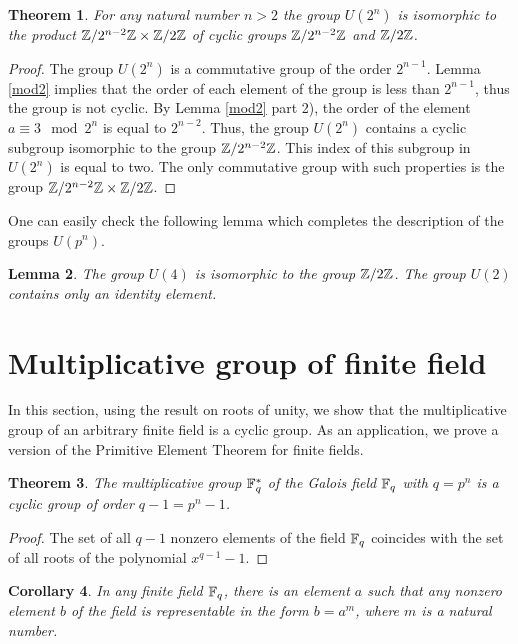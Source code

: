 \documentclass[11pt]{article}
\theoremstyle{plain}
\newtheorem{theorem}{Theorem}[section]
\newtheorem{lemma}[theorem]{Lemma}
\newtheorem{corollary}[theorem]{Corollary}
\theoremstyle{definition}
\begin{document}
\begin{theorem}\label{ucyclictwo}
 For any natural number $n>2$ the group $U(2^n)$ is isomorphic to the product $\Bbb Z/2^{n-2}\Bbb Z\times \Bbb Z/ 2 \Bbb Z$ of cyclic groups  $\Bbb Z/2^{n-2}\Bbb Z$ and $\Bbb Z/ 2 \Bbb Z$.
\end{theorem}

\begin{proof} The group $U(2^n)$ is a commutative group of the order $2^{n-1}$.  Lemma \ref{mod2} implies that the order of each element of the group is less than $2^{n-1 }$, thus the group is not cyclic. By Lemma \ref{mod2} part 2), the order of the  element $a\equiv 3\mod 2^n$ is equal to
 $2^{n-2}$.  Thus, the group $U(2^n)$ contains a cyclic subgroup isomorphic to the group  $\Bbb Z/2^{n-2}\Bbb Z$. This index of this subgroup in $U(2^n)$ is equal to two. The only commutative group with such properties is the group
$\Bbb Z/2^{n-2}\Bbb Z\times \Bbb Z/ 2 \Bbb Z$.
\end{proof}

One can easily check the following lemma which completes  the description of the groups $U(p^n)$.

\begin{lemma}\label{easy} The group $U(4)$ is isomorphic to the group $\Bbb Z/2 \Bbb Z$. The group $U(2)$ contains only an identity element.
\end{lemma}

\section{Multiplicative group of finite field}\label{extrasec}

In this section, using the  result on roots of unity,
 we show   that the multiplicative group of an arbitrary finite field is a cyclic group. As an application, we prove a version of the Primitive Element Theorem for finite fields.

\begin{theorem}\label{multfield} The multiplicative group $\Bbb F^*_q$ of the Galois field $\Bbb F_q$ with $q=p^n$ is a cyclic group of order $q-1=p^n-1$.
\end{theorem}

\begin{proof} The set of all $q-1$ nonzero elements of the field $\Bbb F_q$ coincides with the set of all roots of the polynomial $x^{q-1}-1$.
\end{proof}

\begin{corollary}\label{finprimel} In any  finite field $\Bbb F_q$, there is an element $a$ such that any nonzero element $b$ of the field is representable in the form $b=a^m$, where $m$ is a natural number.
\end{corollary}
\end{document}
